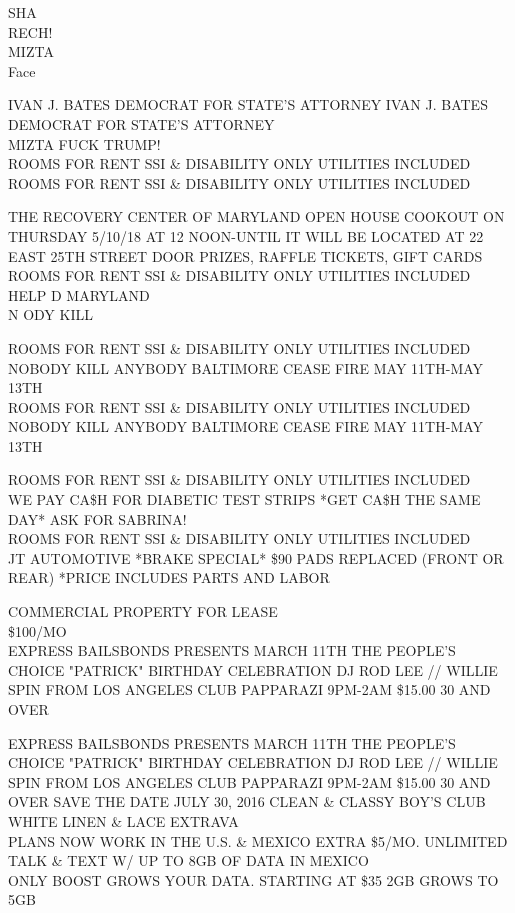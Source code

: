 \documentclass[10pt,letterpaper]{article}
\begin{document}
SHA\\
RECH!\\
MIZTA\\
Face

IVAN J. BATES DEMOCRAT FOR STATE'S ATTORNEY IVAN J. BATES DEMOCRAT FOR STATE'S ATTORNEY\\
MIZTA FUCK TRUMP!\\
ROOMS FOR RENT SSI \& DISABILITY ONLY UTILITIES INCLUDED\\
ROOMS FOR RENT SSI \& DISABILITY ONLY UTILITIES INCLUDED

THE RECOVERY CENTER OF MARYLAND OPEN HOUSE COOKOUT ON THURSDAY 5/10/18 AT 12 NOON{-}UNTIL IT WILL BE LOCATED AT 22 EAST 25TH STREET DOOR PRIZES, RAFFLE TICKETS, GIFT CARDS\\
ROOMS FOR RENT SSI \& DISABILITY ONLY UTILITIES INCLUDED\\
HELP D MARYLAND\\
N ODY KILL

ROOMS FOR RENT SSI \& DISABILITY ONLY UTILITIES INCLUDED\\
NOBODY KILL ANYBODY BALTIMORE CEASE FIRE MAY 11TH{-}MAY 13TH\\
ROOMS FOR RENT SSI \& DISABILITY ONLY UTILITIES INCLUDED NOBODY KILL ANYBODY BALTIMORE CEASE FIRE MAY 11TH{-}MAY 13TH

ROOMS FOR RENT SSI \& DISABILITY ONLY UTILITIES INCLUDED\\
WE PAY CA\$H FOR DIABETIC TEST STRIPS *GET CA\$H THE SAME DAY* ASK FOR SABRINA!\\
ROOMS FOR RENT SSI \& DISABILITY ONLY UTILITIES INCLUDED\\
JT AUTOMOTIVE *BRAKE SPECIAL* \$90 PADS REPLACED (FRONT OR REAR) *PRICE INCLUDES PARTS AND LABOR

COMMERCIAL PROPERTY FOR LEASE\\
\$100/MO\\
EXPRESS BAILSBONDS PRESENTS MARCH 11TH THE PEOPLE'S CHOICE "PATRICK" BIRTHDAY CELEBRATION DJ ROD LEE // WILLIE SPIN FROM LOS ANGELES CLUB PAPPARAZI 9PM{-}2AM \$15.00 30 AND OVER

EXPRESS BAILSBONDS PRESENTS MARCH 11TH THE PEOPLE'S CHOICE "PATRICK" BIRTHDAY CELEBRATION DJ ROD LEE // WILLIE SPIN FROM LOS ANGELES CLUB PAPPARAZI 9PM{-}2AM \$15.00 30 AND OVER SAVE THE DATE JULY 30, 2016 CLEAN \& CLASSY BOY'S CLUB WHITE LINEN \& LACE EXTRAVA\\
PLANS NOW WORK IN THE U.S. \& MEXICO EXTRA \$5/MO. UNLIMITED TALK \& TEXT W/ UP TO 8GB OF DATA IN MEXICO\\
ONLY BOOST GROWS YOUR DATA.  STARTING AT \$35 2GB GROWS TO 5GB
\end{document}

